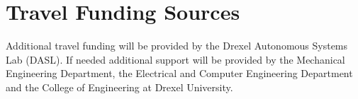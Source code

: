 \documentclass[11pt,a4paper,oneside]{report}
\begin{document}
\section*{Travel Funding Sources}
Additional travel funding will be provided by the Drexel Autonomous Systems Lab (DASL).  If needed additional support will be provided by the Mechanical Engineering Department, the Electrical and Computer Engineering Department and the College of Engineering at Drexel University.
\end{document}
